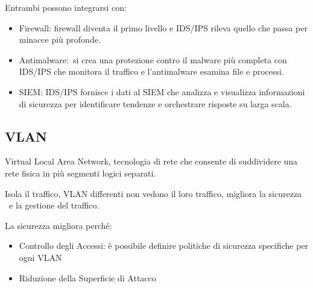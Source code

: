 \documentclass[
]{article}
\providecommand{\tightlist}{%
  \setlength{\itemsep}{0pt}\setlength{\parskip}{0pt}}
\begin{document}
{}

{}

{Entrambi possono integrarsi con:}

\begin{itemize}
\tightlist
\item
  {Firewall}{: firewall diventa il primo livello e IDS/IPS rileva quello
  che passa per minacce più profonde.}
\end{itemize}

{}

\begin{itemize}
\tightlist
\item
  {Antimalware}{:}{~si crea una protezione contro il malware più
  completa con IDS/IPS che monitora il traffico e l'antimalware esamina
  file e processi.}
\end{itemize}

{}

\begin{itemize}
\tightlist
\item
  {SIEM}{: IDS/IPS fornisce i dati al SIEM che analizza e visualizza
  informazioni di sicurezza per identificare tendenze e orchestrare
  risposte su larga scala.}
\end{itemize}

\subsection{\texorpdfstring{{VLAN}}{VLAN}}\label{h.qxbbnriwdbkp}

{Virtual Local Area Network, tecnologia di rete che consente di
suddividere una rete fisica in più segmenti logici separati. }

{}

{Isola il traffico, VLAN differenti non vedono il loro traffico,
migliora la sicurezza ~e la gestione del traffico.}

{}

{La sicurezza migliora perché:}

\begin{itemize}
\tightlist
\item
  {Controllo degli Accessi}{: è possibile definire politiche di
  sicurezza specifiche per ogni VLAN}
\end{itemize}

{}

\begin{itemize}
\tightlist
\item
  {Riduzione della Superficie di Attacco}
\end{itemize}
\end{document}

